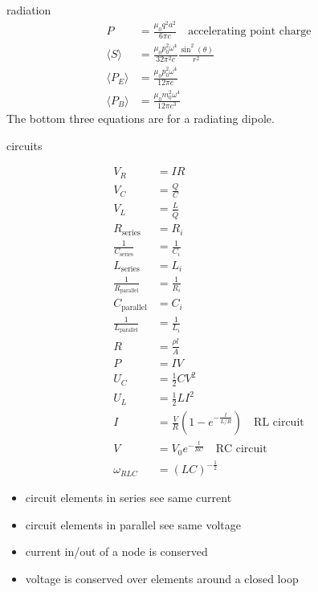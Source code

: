 \documentclass[avery5388, frame, grid]{flashcards}
\begin{document}
\begin{flashcard}{radiation}
  {
    \begin{align*}
      P &= \frac{\mu_{0} q^{2} a^{2}}{6 \pi c} \quad \textrm{accelerating point charge}\\
      \langle S \rangle &= \frac{\mu_{0} p_{0}^{2} \omega^{4}}{32 \pi^{2} c} \frac{\sin^{2}(\theta)}{r^{2}}\\
      \langle P_{E} \rangle &= \frac{\mu_{0} p_{0}^{2} \omega^{4}}{12 \pi c}\\
      \langle P_{B} \rangle &= \frac{\mu_{0} m_{0}^{2} \omega^{4}}{12 \pi c^{3}}
    \end{align*}
    The bottom three equations are for a radiating dipole.
  }
\end{flashcard}

\begin{flashcard}{circuits}
  {
    \begin{align*}
      V_{R} &= IR\\
      V_{C} &= \frac{Q}{C}\\
      V_{L} &= \frac{L}{\ddot{Q}}\\
      R_{\textrm{series}} &= R_{i}\\
      \frac{1}{C_{\textrm{series}}} &= \frac{1}{C_{i}}\\
      L_{\textrm{series}} &= L_{i}\\
      \frac{1}{R_{\textrm{parallel}}} &= \frac{1}{R_{i}}\\
      C_{\textrm{parallel}} &= C_{i}\\
      \frac{1}{L_{\textrm{parallel}}} &= \frac{1}{L_{i}}\\
      R &= \frac{\rho l}{A}\\
      P &= IV\\
      U_{C} &= \frac{1}{2} C V^{2}\\
      U_{L} &= \frac{1}{2} L I^{2}\\
      I &= \frac{V}{R}(1 - e^{-\frac{t}{L/R}}) \quad \textrm{RL circuit}\\
      V &= V_{0}e^{-\frac{t}{RC}} \quad \textrm{RC circuit}\\
      \omega_{RLC} &= (L C)^{-\frac{1}{2}}
    \end{align*}
    \begin{itemize}
    \item circuit elements in series see same current
    \item circuit elements in parallel see same voltage
    \item current in/out of a node is conserved
    \item voltage is conserved over elements around a closed loop
    \end{itemize}
  }
\end{flashcard}
\end{document}
